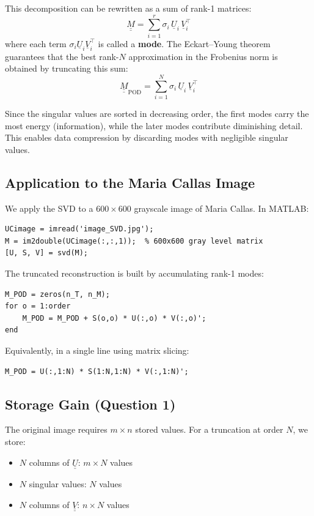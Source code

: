 \documentclass[11pt,a4paper]{article}
\begin{document}
This decomposition can be rewritten as a sum of rank-1 matrices:
\begin{equation}
    \underline{\underline{M}} = \sum_{i=1}^{r} \sigma_i \, \underline{U}_i \, \underline{V}_i^\top
\end{equation}
where each term $\sigma_i \underline{U}_i \underline{V}_i^\top$ is called a \textbf{mode}. The Eckart--Young theorem guarantees that the best rank-$N$ approximation in the Frobenius norm is obtained by truncating this sum:
\begin{equation}
    \underline{\underline{M}}_{\text{POD}} = \sum_{i=1}^{N} \sigma_i \, \underline{U}_i \, \underline{V}_i^\top
\end{equation}

Since the singular values are sorted in decreasing order, the first modes carry the most energy (information), while the later modes contribute diminishing detail. This enables data compression by discarding modes with negligible singular values.

\subsection{Application to the Maria Callas Image}

We apply the SVD to a $600 \times 600$ grayscale image of Maria Callas. In MATLAB:

\begin{lstlisting}
UCimage = imread('image_SVD.jpg');
M = im2double(UCimage(:,:,1));  % 600x600 gray level matrix
[U, S, V] = svd(M);
\end{lstlisting}

The truncated reconstruction is built by accumulating rank-1 modes:

\begin{lstlisting}
M_POD = zeros(n_T, n_M);
for o = 1:order
    M_POD = M_POD + S(o,o) * U(:,o) * V(:,o)';
end
\end{lstlisting}

Equivalently, in a single line using matrix slicing:
\begin{lstlisting}
M_POD = U(:,1:N) * S(1:N,1:N) * V(:,1:N)';
\end{lstlisting}

\subsection{Storage Gain (Question 1)}

The original image requires $m \times n$ stored values. For a truncation at order $N$, we store:
\begin{itemize}
    \item $N$ columns of $\underline{\underline{U}}$: $m \times N$ values
    \item $N$ singular values: $N$ values
    \item $N$ columns of $\underline{\underline{V}}$: $n \times N$ values
\end{itemize}
\end{document}
